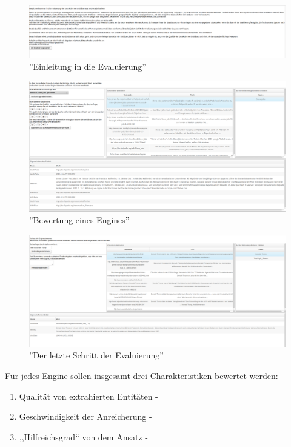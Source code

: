 \begin{figure}
\centering
\includegraphics[width=1.0\textwidth]{Bilder/evalstep1.png}
\caption{''Einleitung in die Evaluierung''}
\label{fig:evalstep01}
\end{figure}

\begin{figure}
\centering
\includegraphics[width=1.0\textwidth]{Bilder/evalstep2.png}
\caption{''Bewertung eines Engines''}
\label{fig:evalstep01}
\end{figure}

\begin{figure}
\centering
\includegraphics[width=1.0\textwidth]{Bilder/evalstep3.png}
\caption{''Der letzte Schritt der Evaluierung''}
\label{fig:evalstep01}
\end{figure}

Für jedes Engine sollen insgesamt drei Charakteristiken bewertet werden:
\begin{enumerate}
\item Qualität von extrahierten Entitäten - 
\item Geschwindigkeit der Anreicherung - 
\item ,,Hilfreichsgrad`` von dem Ansatz - 
\end{enumerate}

